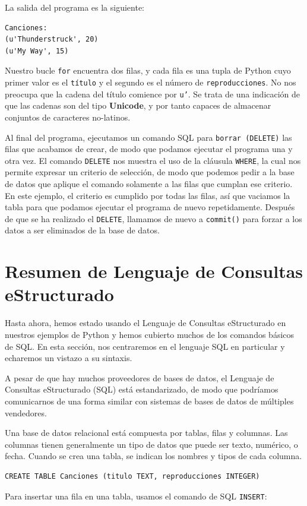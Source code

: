 La salida del programa es la siguiente:

\beforeverb
\begin{verbatim}
Canciones:
(u'Thunderstruck', 20)
(u'My Way', 15)
\end{verbatim}
\afterverb
%
Nuestro bucle {\tt for} encuentra dos filas, y cada fila es una tupla de Python cuyo
primer valor es el {\tt título} y el segundo es el número de {\tt reproducciones}.
No nos preocupa que la cadena del título comience por
{\tt u'}. Se trata de una indicación de que las cadenas son del tipo {\bf Unicode},
y por tanto capaces de almacenar conjuntos de caracteres no-latinos.

Al final del programa, ejecutamos un comando SQL para {\tt borrar (DELETE)}
las filas que acabamos de crear, de modo que podamos ejecutar el programa una y otra vez.
El comando {\tt DELETE} nos muestra el uso de la cláusula {\tt WHERE}, la cual
nos permite expresar un criterio de selección, de modo que podemos pedir a la base de datos
que aplique el comando solamente a las filas que cumplan ese criterio. En este ejemplo,
el criterio es cumplido por todas las filas, así que vaciamos la tabla
para que podamos ejecutar el programa de nuevo repetidamente. Después de que se ha realizado el
{\tt DELETE}, llamamos de nuevo a {\tt commit()} para forzar a los datos a ser eliminados de
la base de datos.

\section{Resumen de Lenguaje de Consultas eStructurado}

Hasta ahora, hemos estado usando el Lenguaje de Consultas eStructurado en nuestros
ejemplos de Python y hemos cubierto muchos de los comandos básicos de SQL.
En esta sección, nos centraremos en el lenguaje SQL en particular
y echaremos un vistazo a su sintaxis.

A pesar de que hay muchos proveedores de bases de datos, el Lenguaje de Consultas
eStructurado (SQL) está estandarizado, de modo que podríamos comunicarnos de una forma
similar con sistemas de bases de datos de múltiples vendedores. 

Una base de datos relacional está compuesta por tablas, filas y columnas. Las columnas
tienen generalmente un tipo de datos que puede ser texto, numérico, o fecha. Cuando se crea
una tabla, se indican los nombres y tipos de cada columna.

\beforeverb
\begin{verbatim}
CREATE TABLE Canciones (titulo TEXT, reproducciones INTEGER)
\end{verbatim}
\afterverb
%
Para insertar una fila en una tabla, usamos el comando de SQL {\tt INSERT}:

